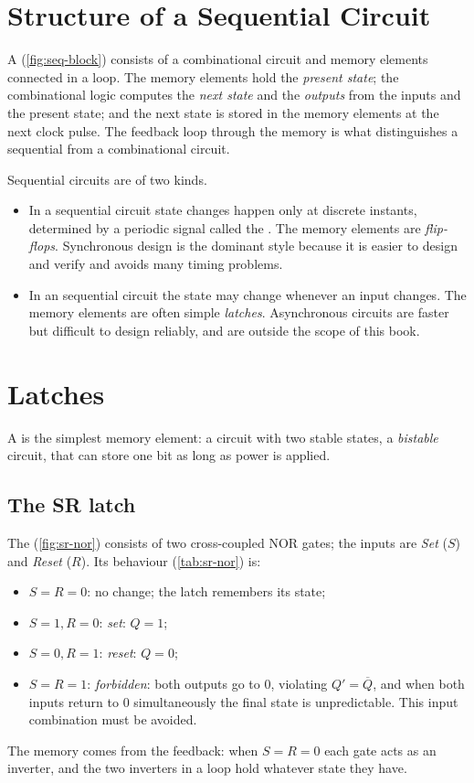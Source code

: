 \section{Structure of a Sequential Circuit}
A  (\cref{fig:seq-block}) consists of a combinational circuit and memory elements connected in a loop. The memory elements hold the \emph{present state}; the combinational logic computes the \emph{next state} and the \emph{outputs} from the inputs and the present state; and the next state is stored in the memory elements at the next clock pulse. The feedback loop through the memory is what distinguishes a sequential from a combinational circuit.


Sequential circuits are of two kinds.
\begin{itemize}
  \item In a  sequential circuit state changes happen only at discrete instants, determined by a periodic signal called the . The memory elements are \emph{flip-flops}. Synchronous design is the dominant style because it is easier to design and verify and avoids many timing problems.
  \item In an  sequential circuit the state may change whenever an input changes. The memory elements are often simple \emph{latches}. Asynchronous circuits are faster but difficult to design reliably, and are outside the scope of this book.
\end{itemize}

\section{Latches}\label{sec:latches}
A  is the simplest memory element: a circuit with two stable states, a \emph{bistable} circuit, that can store one bit as long as power is applied.

\subsection{The SR latch}
The  (\cref{fig:sr-nor}) consists of two cross-coupled NOR gates; the inputs are \emph{Set} ($S$) and \emph{Reset} ($R$). Its behaviour (\cref{tab:sr-nor}) is:
\begin{itemize}
  \item $S=R=0$: no change; the latch remembers its state;
  \item $S=1,R=0$: \emph{set}: $Q=1$;
  \item $S=0,R=1$: \emph{reset}: $Q=0$;
  \item $S=R=1$: \emph{forbidden}: both outputs go to 0, violating $Q'=\overline{Q}$, and when both inputs return to 0 simultaneously the final state is unpredictable. This input combination must be avoided.
\end{itemize}
The memory comes from the feedback: when $S=R=0$ each gate acts as an inverter, and the two inverters in a loop hold whatever state they have.


